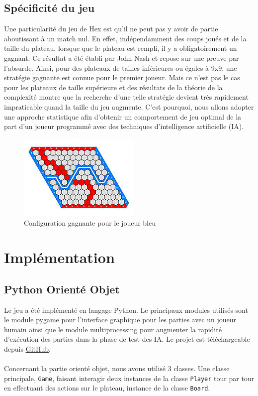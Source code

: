 \documentclass[a4paper]{article}
\theoremstyle{definition}
\begin{document}
\subsection{Spécificité du jeu}

Une particularité du jeu de Hex est qu'il ne peut pas y avoir de partie aboutissant à un match nul. En effet, indépendamment des coups joués et de la taille du plateau, lorsque que le plateau est rempli, il y a obligatoirement un gagnant. Ce résultat a été établi par John Nash et repose sur une preuve par l'absurde.
Ainsi, pour des plateaux de tailles inférieures ou égales à 9x9, une stratégie gagnante est connue pour le premier joueur. Mais ce n'est pas le cas pour les plateaux de taille supérieure et des résultats de la théorie de la complexité montre que la recherche d'une telle stratégie devient très rapidement impraticable quand la taille du jeu augmente. C'est pourquoi, nous allons adopter une approche statistique afin d'obtenir un comportement de jeu optimal de la part d'un joueur programmé avec des techniques d'intelligence artificielle (IA).

\begin{figure}[h]
	\centering
	\includegraphics[scale=1]{11x11_gagnant.jpg}
	\caption{Configuration gagnante pour le joueur bleu}
\end{figure}

\section{Implémentation}

\subsection{Python Orienté Objet}

Le jeu a été implémenté en langage Python. Le principaux modules utilisés sont le module pygame pour l'interface graphique pour les parties avec un joueur humain ainsi que le module multiprocessing pour augmenter la rapidité d'exécution des parties dans la phase de test des IA. Le projet est téléchargeable depuis \href{https://github.com/Maxime-LP/Hex-Game}{GitHub}.\\
\\
Concernant la partie orienté objet, nous avons utilisé 3 classes. Une classe principale, \texttt{Game}, faisant interagir deux instances de la classe \texttt{Player} tour par tour en effectuant des actions sur le plateau, instance de la classe \texttt{Board}.
\end{document}
